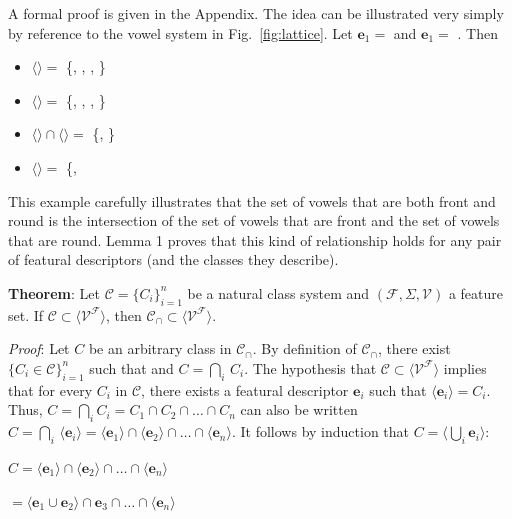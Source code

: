 \documentclass[11pt, oneside]{article}   	%
\begin{document}
A formal proof is given in the Appendix. The idea can be illustrated very simply by reference to the vowel system in Fig.~\ref{fig:lattice}. Let $\mathbf{e}_1 =$  and $\mathbf{e}_1 =$ . Then \begin{itemize}
    \item $\langle$$\rangle =$ \{\textipa{\oe}, , , \}
    \item $\langle$$\rangle =$ \{\textipa{\oe}, , , \}
    \item $\langle$$\rangle \cap \langle$$\rangle =$ \{\textipa{\oe}, \}
    \item $\langle$$\rangle =$ \{\textipa{\oe}, \
    \end{itemize}
This example carefully illustrates that the set of vowels that are both front and round is the intersection of the set of vowels that are front and the set of vowels that are round. Lemma 1 proves that this kind of relationship holds for any pair of featural descriptors (and the classes they describe).

\vspace{\baselineskip} \noindent \textbf{Theorem}: Let $\mathcal C = \{C_i\}_{i=1}^n$ be a natural class system and $(\mathcal F, \Sigma, \mathcal V)$ a feature set. If $\mathcal C \subset \langle \mathcal V^\mathcal F \rangle$, then $\mathcal C_\cap \subset\langle \mathcal V^\mathcal F \rangle $.

\textit{Proof}: Let $C$ be an arbitrary class in $\mathcal C_\cap$. By definition of $\mathcal C_\cap$, there exist $\{C_i \in \mathcal C\}_{i=1}^n$ such that and $C = \bigcap_i \, C_i$. The hypothesis that $\mathcal C \subset \langle \mathcal V^\mathcal F \rangle $ implies that for every $C_i$ in $\mathcal C$, there exists a featural descriptor $\mathbf{e}_i$ such that $\langle \mathbf{e}_i \rangle = C_i$. Thus, $C = \bigcap_i C_i = C_1 \cap C_2 \cap \ldots \cap C_n$ can also be written $C = \bigcap_i \, \langle \mathbf{e}_i \rangle = \langle \mathbf{e}_1 \rangle \cap  \langle \mathbf{e}_2 \rangle \cap \ldots \cap  \langle \mathbf{e}_n \rangle$. It follows by induction that $C = \langle \bigcup_i  \mathbf{e}_i \rangle$:

$C = \langle \mathbf{e}_1 \rangle \cap  \langle \mathbf{e}_2 \rangle \cap \ldots \cap  \langle \mathbf{e}_n \rangle$

\quad $ = \langle \mathbf{e}_1 \cup \mathbf{e}_2 \rangle \cap \mathbf{e}_3 \cap \ldots \cap \langle \mathbf{e}_n \rangle$
\end{document}
